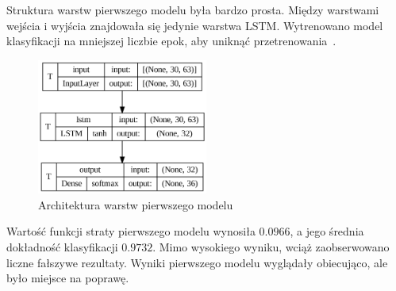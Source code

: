 Struktura warstw pierwszego modelu była bardzo prosta. Między warstwami wejścia i wyjścia znajdowała się jedynie warstwa LSTM. Wytrenowano model klasyfikacji na mniejszej liczbie epok, aby uniknąć przetrenowania~\cite{dietterich1995}.

\begin{figure}[H]
    \centering
    \includegraphics[width=0.5\textwidth]{figures/initial-layers}
    \caption{Architektura warstw pierwszego modelu}
    \label{fig:initial-layers}
\end{figure}

Wartość funkcji straty pierwszego modelu wynosiła $0.0966$, a jego średnia dokładność klasyfikacji $0.9732$. Mimo wysokiego wyniku, wciąż zaobserwowano liczne fałszywe rezultaty. Wyniki pierwszego modelu wyglądały obiecująco, ale było miejsce na poprawę.

